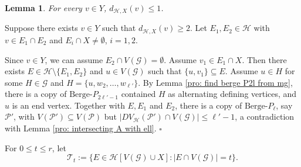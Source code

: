 \documentclass[12pt]{article}%
\newtheorem{lemma}[theorem]{Lemma}
\newenvironment{proof}{{\noindent\it Proof.}}{\hfill $\square$\par}
\newcommand{\ber}{\text{Berge-}}
\newcommand{\mh}{\mathcal{H}}
\newcommand{\mg}{\mathcal{G}}
\begin{document}
\begin{lemma}\label{lem:E(X,Y)}
    For every $v\in Y$, $d_{\mh,X}(v)\leq 1$.
\end{lemma}
 \begin{proof}
     Suppose there exists $v\in Y$ such that $d_{\mh,X}(v)\geq 2$. Let $E_1,E_2\in \mh$ with $v\in E_1\cap E_2$ and $E_i\cap X\not=\emptyset$, $i=1,2$.
     \par
          Since $v\in Y$, we can assume $E_2\cap V(\mg)=\emptyset$. Assume  $v_1\in E_1\cap X$. Then  there exists  $E\in \mh\setminus\{E_1,E_2\}$ and  $u\in V(\mg)$ such that $\{u,v_1\}\subseteq E$. Assume $u\in H$ for some $H\in \mg$ and $H=\{u,w_2,\dots,w_{\ell'}\}$. By Lemma \ref{pro: find berge P2l from mg}, there is a copy of $\ber P_{2\ell'-1}$ contained $H$ as alternating defining vertices, and $u$ is an end vertex. Together with $E, E_1$ and $E_2$, there is a copy of $\ber P_{\ell}$, say $\mathcal{P}'$, with $V(\mathcal{P}')\subseteq V(\mathcal{P})$ but $|DV_\mh(\mathcal{P}')\cap V(\mg)|\le \ell'-1$,
     a contradiction with Lemma \ref{pro: intersecting A with ell}.
  \end{proof}

\par
For $0\le t \le r$, let $$\mathcal{T}_t:=\{E\in \mh[V(\mg)\cup X]: |E\cap V(\mg)|=t\}.$$
\end{document}
